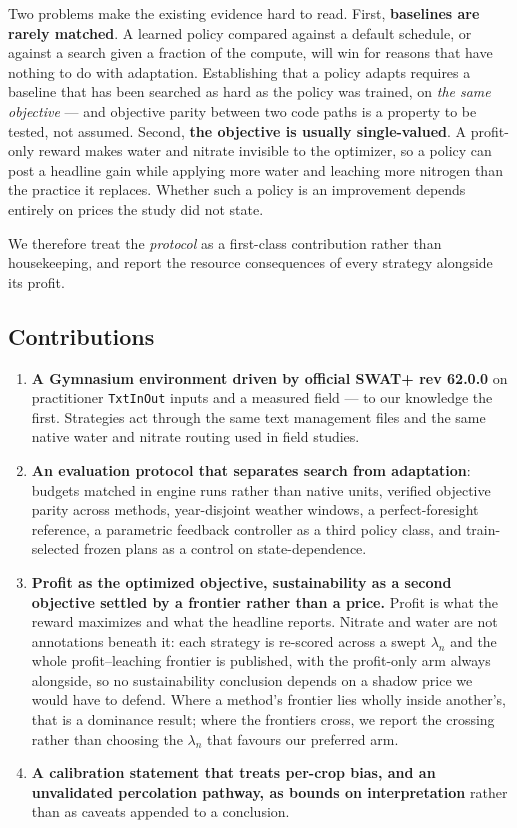 \documentclass[a4paper,fleqn]{cas-sc}
\begin{document}
Two problems make the existing evidence hard to read. First, \textbf{baselines are
rarely matched}. A learned policy compared against a default schedule, or against a
search given a fraction of the compute, will win for reasons that have nothing to do
with adaptation. Establishing that a policy adapts requires a baseline that has been
searched as hard as the policy was trained, on \emph{the same objective} --- and
objective parity between two code paths is a property to be tested, not assumed.
Second, \textbf{the objective is usually single-valued}. A profit-only reward makes
water and nitrate invisible to the optimizer, so a policy can post a headline gain
while applying more water and leaching more nitrogen than the practice it replaces.
Whether such a policy is an improvement depends entirely on prices the study did not
state.

We therefore treat the \emph{protocol} as a first-class contribution rather than
housekeeping, and report the resource consequences of every strategy alongside its
profit.

\subsection{Contributions}\label{sec:contributions}

\begin{enumerate}
\item \textbf{A Gymnasium environment driven by official SWAT+ rev 62.0.0} on
practitioner \texttt{TxtInOut} inputs and a measured field --- to our knowledge the
first. Strategies act through the same text management files and the same native water
and nitrate routing used in field studies.
\item \textbf{An evaluation protocol that separates search from adaptation}: budgets
matched in engine runs rather than native units, verified objective parity across
methods, year-disjoint weather windows, a perfect-foresight reference, a parametric
feedback controller as a third policy class, and train-selected frozen plans as a
control on state-dependence.
\item \textbf{Profit as the optimized objective, sustainability as a second objective
settled by a frontier rather than a price.} Profit is what the reward maximizes and
what the headline reports. Nitrate and water are not annotations beneath it: each
strategy is re-scored across a swept $\lambda_n$ and the whole profit--leaching
frontier is published, with the profit-only arm always alongside, so no sustainability
conclusion depends on a shadow price we would have to defend. Where a method's frontier
lies wholly inside another's, that is a dominance result; where the frontiers cross, we
report the crossing rather than choosing the $\lambda_n$ that favours our preferred arm.
\item \textbf{A calibration statement that treats per-crop bias, and an unvalidated
percolation pathway, as bounds on interpretation} rather than as caveats appended to a
conclusion.
\end{enumerate}
\end{document}
